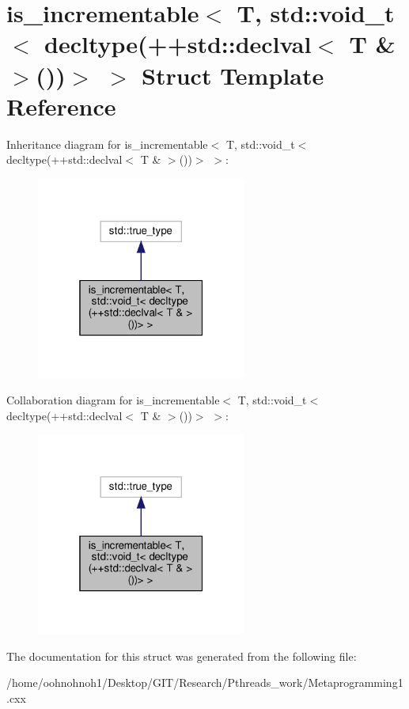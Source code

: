 \hypertarget{structis__incrementable_3_01T_00_01std_1_1void__t_3_01decltype_07_09_09std_1_1declval_3_01T_01_6_01_4_07_08_08_4_01_4}{}\section{is\+\_\+incrementable$<$ T, std\+:\+:void\+\_\+t$<$ decltype(++std\+:\+:declval$<$ T \& $>$())$>$ $>$ Struct Template Reference}
\label{structis__incrementable_3_01T_00_01std_1_1void__t_3_01decltype_07_09_09std_1_1declval_3_01T_01_6_01_4_07_08_08_4_01_4}


Inheritance diagram for is\+\_\+incrementable$<$ T, std\+:\+:void\+\_\+t$<$ decltype(++std\+:\+:declval$<$ T \& $>$())$>$ $>$\+:
\nopagebreak
\begin{figure}[H]
\begin{center}
\leavevmode
\includegraphics[width=196pt]{structis__incrementable_3_01T_00_01std_1_1void__t_3_01decltype_07_09_09std_1_1declval_3_01T_01_626b84646f93e9036207fd1a3d325191b}
\end{center}
\end{figure}


Collaboration diagram for is\+\_\+incrementable$<$ T, std\+:\+:void\+\_\+t$<$ decltype(++std\+:\+:declval$<$ T \& $>$())$>$ $>$\+:
\nopagebreak
\begin{figure}[H]
\begin{center}
\leavevmode
\includegraphics[width=196pt]{structis__incrementable_3_01T_00_01std_1_1void__t_3_01decltype_07_09_09std_1_1declval_3_01T_01_6d213328f6fc3f5a28b2168eb22b51537}
\end{center}
\end{figure}


The documentation for this struct was generated from the following file\+:\begin{DoxyCompactItemize}
\item 
/home/oohnohnoh1/\+Desktop/\+G\+I\+T/\+Research/\+Pthreads\+\_\+work/Metaprogramming1.\+cxx\end{DoxyCompactItemize}
